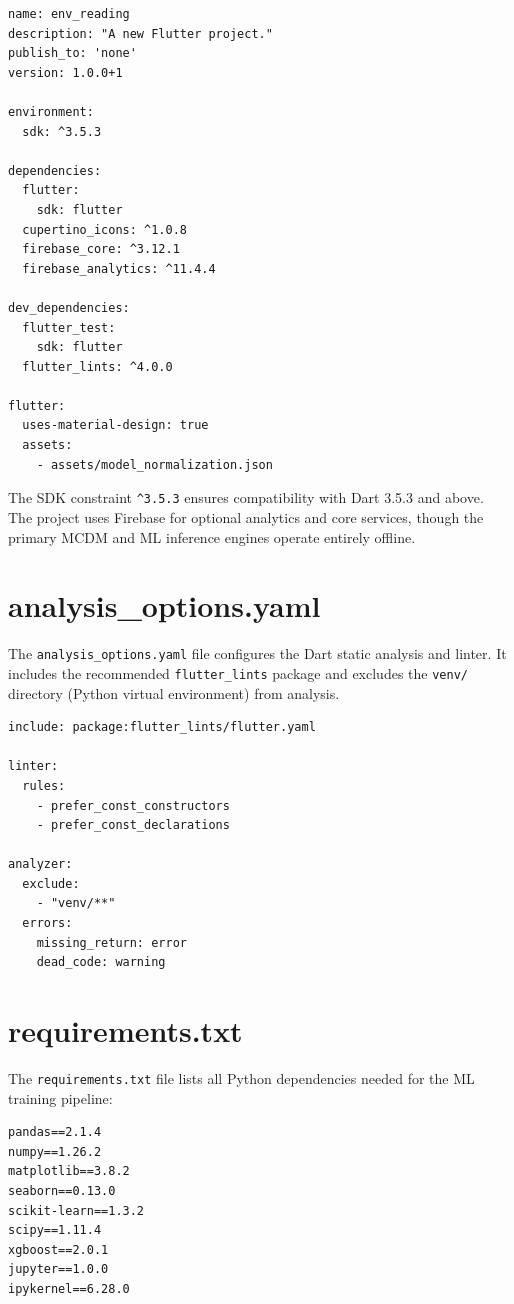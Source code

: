 \documentclass[12pt,a4paper,oneside]{report}
\newcommand{\code}[1]{\texttt{#1}}
\begin{document}
\begin{lstlisting}[style=yamlstyle]
name: env_reading
description: "A new Flutter project."
publish_to: 'none'
version: 1.0.0+1

environment:
  sdk: ^3.5.3

dependencies:
  flutter:
    sdk: flutter
  cupertino_icons: ^1.0.8
  firebase_core: ^3.12.1
  firebase_analytics: ^11.4.4

dev_dependencies:
  flutter_test:
    sdk: flutter
  flutter_lints: ^4.0.0

flutter:
  uses-material-design: true
  assets:
    - assets/model_normalization.json
\end{lstlisting}

The SDK constraint \code{\textasciicircum{}3.5.3} ensures compatibility with Dart 3.5.3 and above. The project uses Firebase for optional analytics and core services, though the primary MCDM and ML inference engines operate entirely offline.

\section{analysis\_options.yaml}

The \texttt{analysis\_options.yaml} file configures the Dart static analysis and linter. It includes the recommended \code{flutter\_lints} package and excludes the \texttt{venv/} directory (Python virtual environment) from analysis.

\begin{lstlisting}[style=yamlstyle]
include: package:flutter_lints/flutter.yaml

linter:
  rules:
    - prefer_const_constructors
    - prefer_const_declarations

analyzer:
  exclude:
    - "venv/**"
  errors:
    missing_return: error
    dead_code: warning
\end{lstlisting}

\section{requirements.txt}

The \texttt{requirements.txt} file lists all Python dependencies needed for the ML training pipeline:

\begin{lstlisting}[style=csvstyle]
pandas==2.1.4
numpy==1.26.2
matplotlib==3.8.2
seaborn==0.13.0
scikit-learn==1.3.2
scipy==1.11.4
xgboost==2.0.1
jupyter==1.0.0
ipykernel==6.28.0
\end{lstlisting}
\end{document}
